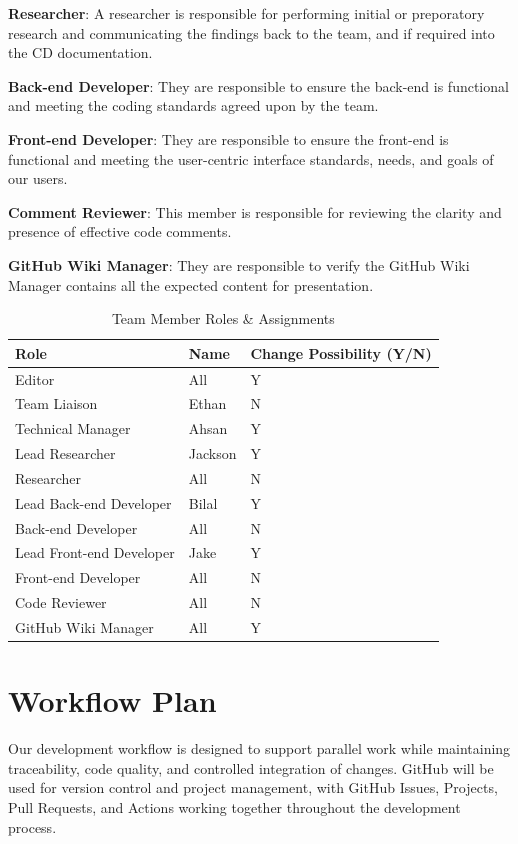 \documentclass{article}
\begin{document}
\textbf{Researcher}: A researcher is responsible for performing initial or preporatory 
research and communicating the findings back to the team, and if required into the CD 
documentation.

\textbf{Back-end Developer}: They are responsible to ensure the back-end is functional 
and meeting the coding standards agreed upon by the team.

\textbf{Front-end Developer}: They are responsible to ensure the front-end is functional 
and meeting the user-centric interface standards, needs, and goals of our users.

\textbf{Comment Reviewer}: This member is responsible for reviewing the clarity and 
presence of effective code comments.

\textbf{GitHub Wiki Manager}: They are responsible to verify the GitHub Wiki Manager 
contains all the expected content for presentation.

\begin{table}[H]
\caption{Team Member Roles \& Assignments} \label{RoleAssignments}
\begin{tabularx}{\textwidth}{llX}
\toprule
\textbf{Role} & \textbf{Name} & \textbf{Change Possibility (Y/N)} \\
\midrule
Editor & All & Y \\
Team Liaison & Ethan & N \\
Technical Manager & Ahsan & Y \\
Lead Researcher & Jackson & Y \\
Researcher & All & N \\
Lead Back-end Developer & Bilal & Y \\
Back-end Developer & All & N \\
Lead Front-end Developer & Jake & Y \\
Front-end Developer & All & N \\
Code Reviewer & All & N \\
GitHub Wiki Manager & All & Y \\

\bottomrule
\end{tabularx}
\end{table}
\section{Workflow Plan}

Our development workflow is designed to support parallel work while maintaining
traceability, code quality, and controlled integration of changes. GitHub will
be used for version control and project management, with GitHub Issues,
Projects, Pull Requests, and Actions working together throughout the
development process.
\end{document}
